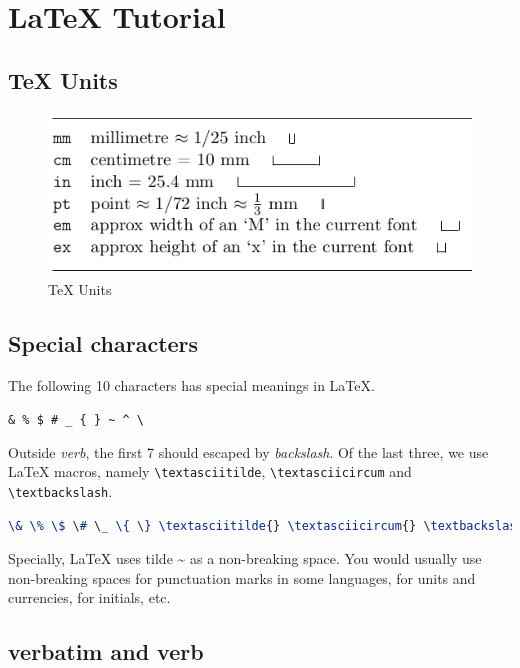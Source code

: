 \chapter{\LaTeX{} Tutorial}
\label{cha:latex-tutorial}

\section{\TeX{} Units}
\label{sec:tex-units}

\begin{figure}[h]
  \centering
  \includegraphics[width=.5\textwidth]{units}
  \caption{\TeX{} Units}
  \label{fig:tex-units}
\end{figure}

\section{Special characters}
\label{sec:special-characters}

The following 10 characters has special meanings in
\LaTeX{}.

\begin{center}
  \verb|& % $ # _ { } ~ ^ \|
\end{center}

Outside \textit{verb}, the first 7 should escaped by
\textit{backslash}. Of the last three, we use \LaTeX{} macros,
namely \verb|\textasciitilde|, \verb|\textasciicircum| and
\verb|\textbackslash|.

\begin{lstlisting}[language=TeX,caption={Special Characters},label={lst:special-characters}]
\& \% \$ \# \_ \{ \} \textasciitilde{} \textasciicircum{} \textbackslash{}
\end{lstlisting}

Specially, \LaTeX{} uses tilde \textasciitilde{} as a non-breaking space. You
would usually use non-breaking spaces for punctuation marks in
some languages, for units and currencies, for initials, etc.

\section{verbatim and verb}
\label{sec:verbatim-verb}

